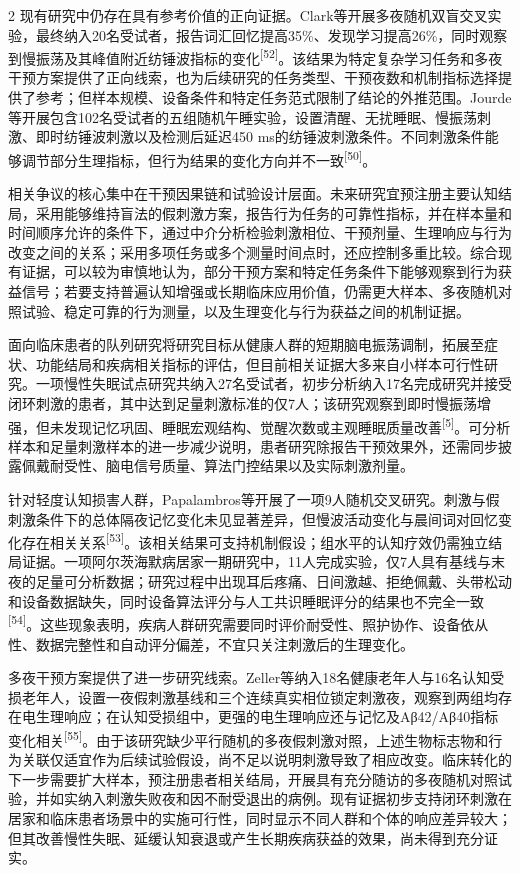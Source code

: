 \documentclass[UTF8,zihao=5,fontset=none]{ctexart}
\newcommand{\hei}{\CJKfamily{hei}}
\newcommand{\leveltwo}[1]{%
  \par\noindent{\hei\fontsize{10.5pt}{12.6pt}\selectfont\mdseries #1\par}}
\newcommand{\refcite}[1]{\nolinebreak[4]\textsuperscript{[#1]}}
\begin{document}
\begin{multicols}{2}
现有研究中仍存在具有参考价值的正向证据。Clark等开展多夜随机双盲交叉实验，最终纳入20名受试者，报告词汇回忆提高35\%、发现学习提高26\%，同时观察到慢振荡及其峰值附近纺锤波指标的变化\refcite{52}。该结果为特定复杂学习任务和多夜干预方案提供了正向线索，也为后续研究的任务类型、干预夜数和机制指标选择提供了参考；但样本规模、设备条件和特定任务范式限制了结论的外推范围。Jourde等开展包含102名受试者的五组随机午睡实验，设置清醒、无扰睡眠、慢振荡刺激、即时纺锤波刺激以及检测后延迟450 ms的纺锤波刺激条件。不同刺激条件能够调节部分生理指标，但行为结果的变化方向并不一致\refcite{50}。\par

相关争议的核心集中在干预因果链和试验设计层面。未来研究宜预注册主要认知结局，采用能够维持盲法的假刺激方案，报告行为任务的可靠性指标，并在样本量和时间顺序允许的条件下，通过中介分析检验刺激相位、干预剂量、生理响应与行为改变之间的关系；采用多项任务或多个测量时间点时，还应控制多重比较。综合现有证据，可以较为审慎地认为，部分干预方案和特定任务条件下能够观察到行为获益信号；若要支持普遍认知增强或长期临床应用价值，仍需更大样本、多夜随机对照试验、稳定可靠的行为测量，以及生理变化与行为获益之间的机制证据。\par

\leveltwo{3.4 慢性失眠、阿尔茨海默病等临床队列研究进展}

面向临床患者的队列研究将研究目标从健康人群的短期脑电振荡调制，拓展至症状、功能结局和疾病相关指标的评估，但目前相关证据大多来自小样本可行性研究。一项慢性失眠试点研究共纳入27名受试者，初步分析纳入17名完成研究并接受闭环刺激的患者，其中达到足量刺激标准的仅7人；该研究观察到即时慢振荡增强，但未发现记忆巩固、睡眠宏观结构、觉醒次数或主观睡眠质量改善\refcite{5}。可分析样本和足量刺激样本的进一步减少说明，患者研究除报告干预效果外，还需同步披露佩戴耐受性、脑电信号质量、算法门控结果以及实际刺激剂量。\par

针对轻度认知损害人群，Papalambros等开展了一项9人随机交叉研究。刺激与假刺激条件下的总体隔夜记忆变化未见显著差异，但慢波活动变化与晨间词对回忆变化存在相关关系\refcite{53}。该相关结果可支持机制假设；组水平的认知疗效仍需独立结局证据。一项阿尔茨海默病居家一期研究中，11人完成实验，仅7人具有基线与末夜的足量可分析数据；研究过程中出现耳后疼痛、日间激越、拒绝佩戴、头带松动和设备数据缺失，同时设备算法评分与人工共识睡眠评分的结果也不完全一致\refcite{54}。这些现象表明，疾病人群研究需要同时评价耐受性、照护协作、设备依从性、数据完整性和自动评分偏差，不宜只关注刺激后的生理变化。\par

多夜干预方案提供了进一步研究线索。Zeller等纳入18名健康老年人与16名认知受损老年人，设置一夜假刺激基线和三个连续真实相位锁定刺激夜，观察到两组均存在电生理响应；在认知受损组中，更强的电生理响应还与记忆及Aβ42/Aβ40指标变化相关\refcite{55}。由于该研究缺少平行随机的多夜假刺激对照，上述生物标志物和行为关联仅适宜作为后续试验假设，尚不足以说明刺激导致了相应改变。临床转化的下一步需要扩大样本，预注册患者相关结局，开展具有充分随访的多夜随机对照试验，并如实纳入刺激失败夜和因不耐受退出的病例。现有证据初步支持闭环刺激在居家和临床患者场景中的实施可行性，同时显示不同人群和个体的响应差异较大；但其改善慢性失眠、延缓认知衰退或产生长期疾病获益的效果，尚未得到充分证实。\par


\end{multicols}
\end{document}
